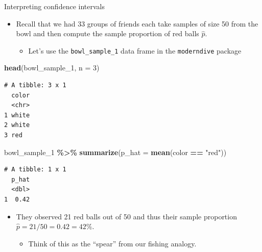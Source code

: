 \documentclass[
  ignorenonframetext,
]{beamer}
\newenvironment{Shaded}{\begin{snugshade}}{\end{snugshade}}
\newcommand{\AttributeTok}[1]{\textcolor[rgb]{0.13,0.29,0.53}{#1}}
\newcommand{\DecValTok}[1]{\textcolor[rgb]{0.00,0.00,0.81}{#1}}
\newcommand{\FunctionTok}[1]{\textcolor[rgb]{0.13,0.29,0.53}{\textbf{#1}}}
\newcommand{\NormalTok}[1]{#1}
\newcommand{\SpecialCharTok}[1]{\textcolor[rgb]{0.81,0.36,0.00}{\textbf{#1}}}
\newcommand{\StringTok}[1]{\textcolor[rgb]{0.31,0.60,0.02}{#1}}
\providecommand{\tightlist}{%
  \setlength{\itemsep}{0pt}\setlength{\parskip}{0pt}}
\begin{document}
\begin{frame}[fragile]{Interpreting confidence intervals}
\protect\hypertarget{interpreting-confidence-intervals-3}{}
\begin{itemize}
\item
  Recall that we had 33 groups of friends each take samples of size 50
  from the bowl and then compute the sample proportion of red balls
  \(\hat{p}\).

  \begin{itemize}
  \tightlist
  \item
    Let's use the \texttt{bowl\_sample\_1} data frame in the
    \texttt{moderndive} package
  \end{itemize}
\end{itemize}

\small

\begin{Shaded}
\begin{Highlighting}[]
\FunctionTok{head}\NormalTok{(bowl\_sample\_1, }\AttributeTok{n =} \DecValTok{3}\NormalTok{)}
\end{Highlighting}
\end{Shaded}

\begin{verbatim}
# A tibble: 3 x 1
  color
  <chr>
1 white
2 white
3 red  
\end{verbatim}

\begin{Shaded}
\begin{Highlighting}[]
\NormalTok{bowl\_sample\_1 }\SpecialCharTok{\%\textgreater{}\%} 
  \FunctionTok{summarize}\NormalTok{(}\AttributeTok{p\_hat =} \FunctionTok{mean}\NormalTok{(color }\SpecialCharTok{==} \StringTok{"red"}\NormalTok{))}
\end{Highlighting}
\end{Shaded}

\begin{verbatim}
# A tibble: 1 x 1
  p_hat
  <dbl>
1  0.42
\end{verbatim}

\normalsize

\begin{itemize}
\item
  They observed 21 red balls out of 50 and thus their sample proportion
  \(\hat{p}=21/50 = 0.42 = 42\%\).

  \begin{itemize}
  \tightlist
  \item
    Think of this as the ``spear'' from our fishing analogy.
  \end{itemize}
\end{itemize}
\end{frame}
\end{document}
